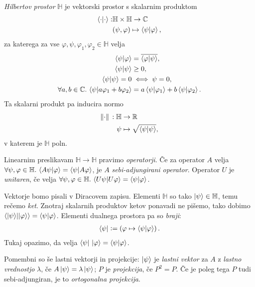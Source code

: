 \documentclass[mat1]{fmfdelo}
\newcommand{\R}{\mathbb R}
\newcommand{\C}{\mathbb C}
\newcommand{\Hb}{\mathbb H}
\renewcommand{\phi}{\varphi}
\newcommand{\defeq}{\vcentcolon=}
\newcommand{\sep}{\ensuremath{.\,}}
\begin{document}
\begin{definicija} \emph{Hilbertov prostor} \(\Hb\) je vektorski prostor s skalarnim produktom
    \begin{align*}
        \braket{\cdot}{\cdot} :& \Hb \times \Hb \to \C\\
        & (\psi, \varphi) \mapsto \braket{\psi}{\phi},
    \end{align*}
    za katerega za vse \(\phi, \psi, \varphi_1, \varphi_2 \in \Hb\) velja
    \begin{align*}
        \braket{\psi}{\varphi} &= \overline{\braket{\varphi}{\psi}},\\
        \braket\psi &\geq 0,\\
        \braket\psi = 0 &\iff \psi = 0,\\
        \forall a,b\in\C\sep \braket{\psi}{a\varphi_1 + b\varphi_2} &=a\braket{\psi}{\varphi_1} + b\braket{\psi}{\varphi_2}.
    \end{align*}
    Ta skalarni produkt pa inducira normo
    \begin{align*}
        \norm*{\cdot} : \Hb &\to \R\\
        \psi &\mapsto \sqrt{\braket\psi},
    \end{align*}
    v katerem je \(\Hb\) poln.
\end{definicija}

Linearnim preslikavam \(\Hb\to\Hb\) pravimo \emph{operatorji}. Če za operator \(A\) velja \(\forall \psi,\phi\in\Hb\sep\braket{A\psi}{\varphi} = \braket{\psi}{A\varphi}\), je \(A\) \emph{sebi-adjungirani operator}. Operator \(U\) je \emph{unitaren}, če velja \(\forall \psi,\varphi\in\Hb\sep \braket{U\psi}{U\varphi} = \braket{\psi}{\varphi}\).

Vektorje bomo pisali v Diracovem zapisu. Elementi \(\Hb\) so tako \(\ket{\psi}\in\Hb\), temu rečemo \emph{ket}. Znotraj skalarnih produktov ketov ponavadi ne pišemo, tako dobimo \(\braket{\ket\psi}{\ket\varphi} = \braket{\psi}{\varphi}\). Elementi dualnega prostora pa so \emph{braji}:
\begin{align*}
    \bra{\psi} \defeq \left(\varphi \mapsto \braket{\psi}{\varphi} \right).
\end{align*}
Tukaj opazimo, da velja \(\bra{\psi}\, \ket{\varphi} = \braket{\psi}{\varphi}\).

Pomembni so še lastni vektorji in projekcije: \(\ket{\psi}\) je \emph{lastni vektor} za \(A\) z \emph{lastno vrednostjo} \(\lambda\), če \(A\ket\psi = \lambda \ket\psi\); \(P\) je \emph{projekcija}, če \(P^2 = P\). Če je poleg tega \(P\) tudi sebi-adjungiran, je to \emph{ortogonalna projekcija}.
\end{document}
